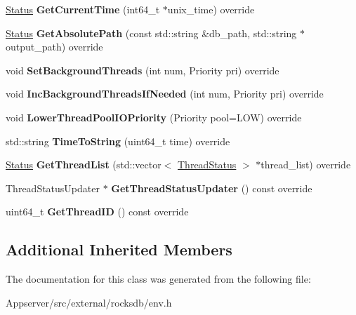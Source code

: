 \begin{DoxyCompactItemize}
\item 
\hyperlink{classrocksdb_1_1Status}{Status} {\bfseries Get\+Current\+Time} (int64\+\_\+t $\ast$unix\+\_\+time) override\hypertarget{classrocksdb_1_1EnvWrapper_a9e4488f871063d0fd72f0fd2919610aa}{}\label{classrocksdb_1_1EnvWrapper_a9e4488f871063d0fd72f0fd2919610aa}

\item 
\hyperlink{classrocksdb_1_1Status}{Status} {\bfseries Get\+Absolute\+Path} (const std\+::string \&db\+\_\+path, std\+::string $\ast$output\+\_\+path) override\hypertarget{classrocksdb_1_1EnvWrapper_a0e10fc987cd3e93ed4f2150e2af350e2}{}\label{classrocksdb_1_1EnvWrapper_a0e10fc987cd3e93ed4f2150e2af350e2}

\item 
void {\bfseries Set\+Background\+Threads} (int num, Priority pri) override\hypertarget{classrocksdb_1_1EnvWrapper_a8fcba7e9f6a8b1fbfd59dbe2aeda5dea}{}\label{classrocksdb_1_1EnvWrapper_a8fcba7e9f6a8b1fbfd59dbe2aeda5dea}

\item 
void {\bfseries Inc\+Background\+Threads\+If\+Needed} (int num, Priority pri) override\hypertarget{classrocksdb_1_1EnvWrapper_a176f3b118d6bbf42d94169c4c2d66814}{}\label{classrocksdb_1_1EnvWrapper_a176f3b118d6bbf42d94169c4c2d66814}

\item 
void {\bfseries Lower\+Thread\+Pool\+I\+O\+Priority} (Priority pool=L\+OW) override\hypertarget{classrocksdb_1_1EnvWrapper_afa78d2ed1ba4c848345cb06175cefa72}{}\label{classrocksdb_1_1EnvWrapper_afa78d2ed1ba4c848345cb06175cefa72}

\item 
std\+::string {\bfseries Time\+To\+String} (uint64\+\_\+t time) override\hypertarget{classrocksdb_1_1EnvWrapper_ab85d8bb25a5b465f6dac690bbb2f3f1a}{}\label{classrocksdb_1_1EnvWrapper_ab85d8bb25a5b465f6dac690bbb2f3f1a}

\item 
\hyperlink{classrocksdb_1_1Status}{Status} {\bfseries Get\+Thread\+List} (std\+::vector$<$ \hyperlink{structrocksdb_1_1ThreadStatus}{Thread\+Status} $>$ $\ast$thread\+\_\+list) override\hypertarget{classrocksdb_1_1EnvWrapper_a8b98931ac26c2a4726e2702d5ea2ecb7}{}\label{classrocksdb_1_1EnvWrapper_a8b98931ac26c2a4726e2702d5ea2ecb7}

\item 
Thread\+Status\+Updater $\ast$ {\bfseries Get\+Thread\+Status\+Updater} () const override\hypertarget{classrocksdb_1_1EnvWrapper_a0a2049d06aad5884a104c216959a9c50}{}\label{classrocksdb_1_1EnvWrapper_a0a2049d06aad5884a104c216959a9c50}

\item 
uint64\+\_\+t {\bfseries Get\+Thread\+ID} () const override\hypertarget{classrocksdb_1_1EnvWrapper_a96c45c0226e3bbb4714e7c695be97c6f}{}\label{classrocksdb_1_1EnvWrapper_a96c45c0226e3bbb4714e7c695be97c6f}

\end{DoxyCompactItemize}
\subsection*{Additional Inherited Members}


The documentation for this class was generated from the following file\+:\begin{DoxyCompactItemize}
\item 
Appserver/src/external/rocksdb/env.\+h\end{DoxyCompactItemize}
